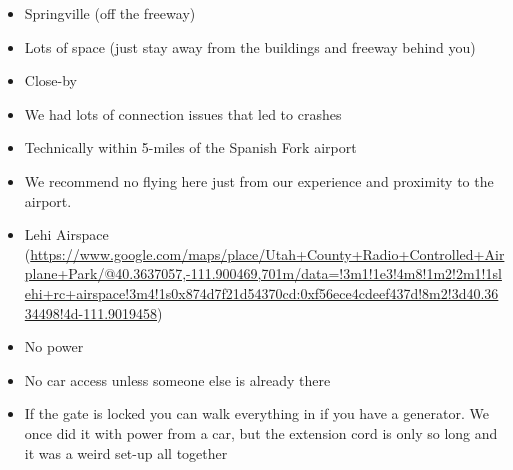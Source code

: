\documentclass[]{auvsi_doc}
\providecommand{\tightlist}{%
  \setlength{\itemsep}{0pt}\setlength{\parskip}{0pt}}
\begin{document}
\begin{itemize}
\tightlist
\item
  {Springville (off the freeway)}
\end{itemize}

\begin{itemize}
\tightlist
\item
  {Lots of space (just stay away from the buildings and freeway behind
  you)}
\item
  {Close-by}
\item
  {We had lots of connection issues that led to crashes}
\item
  {Technically within 5-miles of the Spanish Fork airport}
\item
  {We recommend no flying here just from our experience and proximity to
  the airport.}
\end{itemize}

\begin{itemize}
\tightlist
\item
  {Lehi Airspace
  (}{\href{https://www.google.com/url?q=https://www.google.com/maps/place/Utah\%2BCounty\%2BRadio\%2BControlled\%2BAirplane\%2BPark/@40.3637057,-111.900469,701m/data\%3D!3m1!1e3!4m8!1m2!2m1!1slehi\%2Brc\%2Bairspace!3m4!1s0x874d7f21d54370cd:0xf56ece4cdeef437d!8m2!3d40.3634498!4d-111.9019458\&sa=D\&ust=1564438983443000}{https://www.google.com/maps/place/Utah+County+Radio+Controlled+Airplane+Park/@40.3637057,-111.900469,701m/data=!3m1!1e3!4m8!1m2!2m1!1slehi+rc+airspace!3m4!1s0x874d7f21d54370cd:0xf56ece4cdeef437d!8m2!3d40.3634498!4d-111.9019458}}{)}
\end{itemize}

\begin{itemize}
\tightlist
\item
  {No power}
\item
  {No car access unless someone else is already there}
\end{itemize}

\begin{itemize}
\tightlist
\item
  {If the gate is locked you can walk everything in if you have a
  generator. We once did it with power from a car, but the extension
  cord is only so long and it was a weird set-up all together}
\end{itemize}
\end{document}
